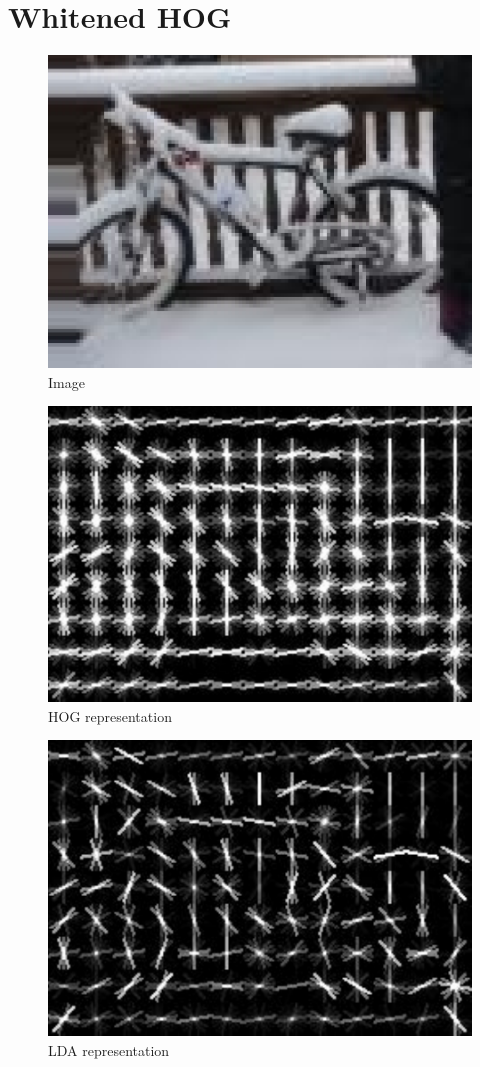 \section{Whitened \ac{HOG}}

\begin{figure}
\centering
\includegraphics[width=0.7\linewidth]{images/whitened_hog_image}
\caption[Image]{Image}
\label{fig:whitened_hog_image}
\end{figure}
\begin{figure}
\centering
\includegraphics[width=0.7\linewidth]{images/whitened_hog_hog}
\caption[HOG representation]{HOG representation}
\label{fig:whitened_hog_hog}
\end{figure}
\begin{figure}
\centering
\includegraphics[width=0.7\linewidth]{images/whitened_hog_lda}
\caption[LDA representation]{LDA representation}
\label{fig:whitened_hog_lda}
\end{figure}
